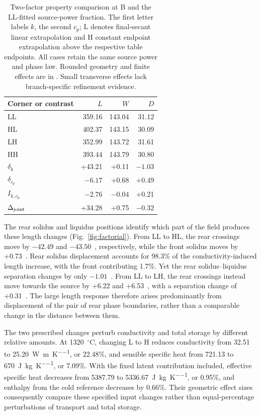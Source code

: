 \begin{table}[htbp]
\centering
\caption{Two-factor property comparison at B and the LL-fitted source-power fraction. The first letter labels $k$, the second $c_p$; L denotes final-secant linear extrapolation and H constant endpoint extrapolation above the respective table endpoints. All cases retain the same source power and phase law. Rounded geometry and finite effects are in \um. Small transverse effects lack branch-specific refinement evidence.}
\label{tab:factorial}
\begin{tabular}{lrrr}
\toprule
Corner or contrast & $L$ & $W$ & $D$\\
\midrule
LL & 359.16 & 143.04 & 31.12\\
HL & 402.37 & 143.15 & 30.09\\
LH & 352.99 & 143.72 & 31.61\\
HH & 393.44 & 143.79 & 30.80\\
\midrule
$\delta_k$ & +43.21 & +0.11 & $-1.03$\\
$\delta_{c_p}$ & $-6.17$ & +0.68 & +0.49\\
$I_{k,c_p}$ & $-2.76$ & $-0.04$ & +0.21\\
$\Delta_{\rm joint}$ & +34.28 & +0.75 & $-0.32$\\
\bottomrule
\end{tabular}
\end{table}

The rear solidus and liquidus positions identify which part of the field produces these length changes (Fig.~\ref{fig:factorial}). From LL to HL, the rear crossings move by $-42.49$ and $-43.50$~\um{}, respectively, while the front solidus moves by +0.73~\um. Rear solidus displacement accounts for 98.3\% of the conductivity-induced length increase, with the front contributing 1.7\%. Yet the rear solidus--liquidus separation changes by only $-1.01$~\um. From LL to LH, the rear crossings instead move towards the source by +6.22 and +6.53~\um, with a separation change of +0.31~\um. The large length response therefore arises predominantly from displacement of the pair of rear phase boundaries, rather than a comparable change in the distance between them.

The two prescribed changes perturb conductivity and total storage by different relative amounts. At 1320~$^\circ$C, changing L to H reduces conductivity from 32.51 to 25.20~\si{\watt\per\metre\per\kelvin}, or 22.48\%, and sensible specific heat from 721.13 to 670~\si{\joule\per\kilogram\per\kelvin}, or 7.09\%. With the fixed latent contribution included, effective specific heat decreases from 5387.79 to 5336.67~\si{\joule\per\kilogram\per\kelvin}, or 0.95\%, and enthalpy from the cold reference decreases by 0.66\%. Their geometric effect sizes consequently compare these specified input changes rather than equal-percentage perturbations of transport and total storage.

